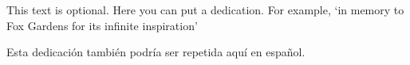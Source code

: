 \begin{center}
\phantom{.}
\vspace{7cm}

This text is optional. Here you can put a dedication. For example, `in
memory to Fox Gardens for its infinite inspiration'

\vspace{2cm}

Esta dedicaci\'on tambi\'en podr\'ia ser repetida aqu\'i en español.

\end{center}
